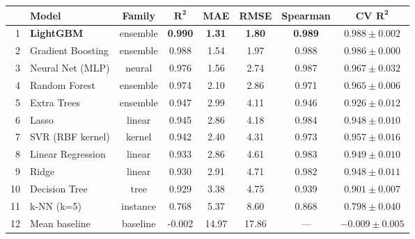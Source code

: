 \begin{tabular}{rlcccccc}
\toprule
& \textbf{Model} & \textbf{Family} & $\boldsymbol{R^2}$ & \textbf{MAE} & \textbf{RMSE} & \textbf{Spearman} & \textbf{CV }$\boldsymbol{R^2}$ \\
\midrule
1 & \textbf{LightGBM} & ensemble & \textbf{0.990} & \textbf{1.31} & \textbf{1.80} & \textbf{0.989} & $0.988 \pm 0.002$ \\
2 & Gradient Boosting & ensemble & 0.988 & 1.54 & 1.97 & 0.988 & $0.986 \pm 0.000$ \\
3 & Neural Net (MLP) & neural & 0.976 & 1.56 & 2.74 & 0.987 & $0.967 \pm 0.032$ \\
4 & Random Forest & ensemble & 0.974 & 2.10 & 2.86 & 0.971 & $0.965 \pm 0.006$ \\
5 & Extra Trees & ensemble & 0.947 & 2.99 & 4.11 & 0.946 & $0.926 \pm 0.012$ \\
6 & Lasso & linear & 0.945 & 2.86 & 4.18 & 0.984 & $0.948 \pm 0.010$ \\
7 & SVR (RBF kernel) & kernel & 0.942 & 2.40 & 4.31 & 0.973 & $0.957 \pm 0.016$ \\
8 & Linear Regression & linear & 0.933 & 2.86 & 4.61 & 0.983 & $0.949 \pm 0.010$ \\
9 & Ridge & linear & 0.930 & 2.91 & 4.71 & 0.982 & $0.948 \pm 0.011$ \\
10 & Decision Tree & tree & 0.929 & 3.38 & 4.75 & 0.939 & $0.901 \pm 0.007$ \\
11 & k-NN (k=5) & instance & 0.768 & 5.37 & 8.60 & 0.868 & $0.798 \pm 0.040$ \\
12 & Mean baseline & baseline & -0.002 & 14.97 & 17.86 & --- & $-0.009 \pm 0.005$ \\
\bottomrule
\end{tabular}
